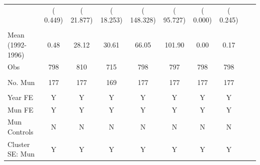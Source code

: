 \begin{tabular}{lccccccccc}
& (       0.449)  & (      21.877) & (      18.253) & (     148.328) & (      95.727)  & (       0.000) & (       0.245)\\ 
  & & &  & & & &  \\ 
Mean (1992-1996) &         0.48  &        28.12 &        30.61 &        66.05 &       101.90 &         0.00&         0.17  \\  
Obs &          798  &          810 &          715 &          798 &          797 &          798 &          798 \\ 
  & & &  & & & &  \\ 
No. Mun &          177  &          177 &          169 &          177 &          177 &          177 &          177 \\  
&  &  &  & &  &  &  & &    \\  
Year FE & Y & Y & Y & Y & Y & Y & Y  \\ 
Mun FE & Y & Y & Y & Y & Y & Y & Y \\ 
Mun Controls & N  & N & N & N & N  & N & N     \\  
Cluster SE: Mun & Y & Y & Y & Y & Y & Y & Y  \\ 
\bottomrule
\end{tabular}